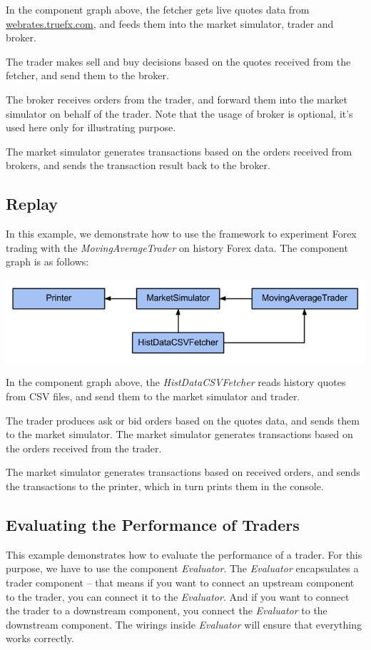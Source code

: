 In the component graph above, the fetcher gets live quotes data from \url{webrates.truefx.com}, and feeds them into the market simulator, trader and broker.

The trader makes sell and buy decisions based on the quotes received from the fetcher, and send them to the broker.

The broker receives orders from the trader, and forward them into the market simulator on behalf of the trader. Note that the usage of broker is optional, it's used here only for illustrating purpose.

The market simulator generates transactions based on the orders received from brokers, and sends the transaction result back to the broker.

\subsection{Replay}

In this example, we demonstrate how to use the framework to experiment Forex trading with the \emph{MovingAverageTrader} on history Forex data. The component graph is as follows:

\noindent
\includegraphics[width=\textwidth]{img/examples/forex-replay}

In the component graph above, the \emph{HistDataCSVFetcher} reads history quotes from CSV files, and send them to the market simulator and trader.

The trader produces ask or bid orders based on the quotes data, and sends them to the market simulator. The market simulator generates transactions based on the orders received from the trader.

The market simulator generates transactions based on received orders, and sends the transactions to the printer, which in turn prints them in the console.

\subsection{Evaluating the Performance of Traders}

This example demonstrates how to evaluate the performance of a trader. For this purpose, we have to use the component \emph{Evaluator}. The \emph{Evaluator} encapsulates a trader component -- that means if you want to connect an upstream component to the trader, you can connect it to the \emph{Evaluator}. And if you want to connect the trader to a downstream component, you connect the \emph{Evaluator} to the downstream component. The wirings inside \emph{Evaluator} will ensure that everything works correctly.


